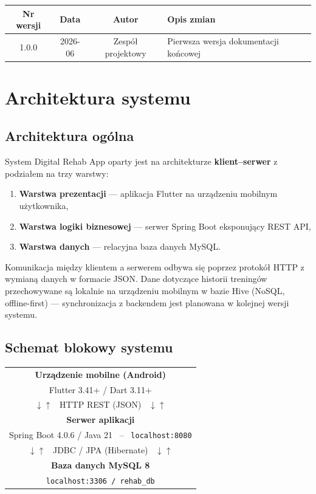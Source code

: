 \documentclass[12pt,a4paper]{article}
\begin{document}
\begin{center}
\begin{tabular}{cccp{5.5cm}}
  \toprule
  \textbf{Nr wersji} & \textbf{Data} & \textbf{Autor} & \textbf{Opis zmian} \\
  \midrule
  1.0.0 & 2026-06 & Zespół projektowy & Pierwsza wersja dokumentacji końcowej \\
  \bottomrule
\end{tabular}
\end{center}

\section{Architektura systemu}

\subsection{Architektura ogólna}

System Digital Rehab App oparty jest na architekturze \textbf{klient--serwer} z podziałem na trzy warstwy:
\begin{enumerate}
  \item \textbf{Warstwa prezentacji} --- aplikacja Flutter na urządzeniu mobilnym użytkownika,
  \item \textbf{Warstwa logiki biznesowej} --- serwer Spring Boot eksponujący REST API,
  \item \textbf{Warstwa danych} --- relacyjna baza danych MySQL.
\end{enumerate}

Komunikacja między klientem a serwerem odbywa się poprzez protokół HTTP z wymianą danych w formacie JSON. Dane dotyczące historii treningów przechowywane są lokalnie na urządzeniu mobilnym w bazie Hive (NoSQL, offline-first) --- synchronizacja z backendem jest planowana w kolejnej wersji systemu.

\subsection{Schemat blokowy systemu}

\begin{center}
\renewcommand{\arraystretch}{1.4}
\begin{tabular}{|c|}
\hline
\textbf{Urządzenie mobilne (Android)} \\
Flutter 3.41+ / Dart 3.11+ \\
\hline
$\downarrow\uparrow$ \ HTTP REST (JSON) \ $\downarrow\uparrow$ \\
\hline
\textbf{Serwer aplikacji} \\
Spring Boot 4.0.6 / Java 21 \ -- \ \texttt{localhost:8080} \\
\hline
$\downarrow\uparrow$ \ JDBC / JPA (Hibernate) \ $\downarrow\uparrow$ \\
\hline
\textbf{Baza danych MySQL 8} \\
\texttt{localhost:3306 / rehab\_db} \\
\hline
\end{tabular}
\end{center}
\end{document}
